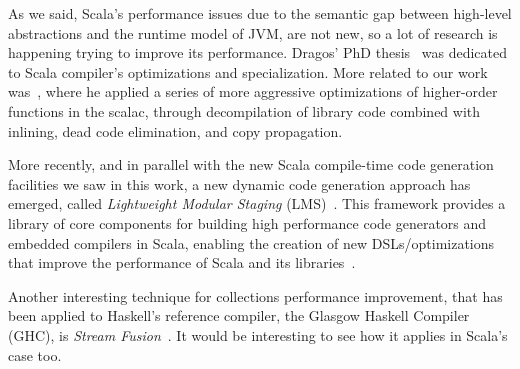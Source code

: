\label{related}
As we said, Scala's performance issues due to the semantic gap between high-level abstractions and the runtime model of JVM, are not new, so a lot of research is happening trying to improve its performance. Dragos' PhD thesis~\cite{dragos2010compiling} was dedicated to Scala compiler's optimizations and specialization. More related to our work was~\cite{dragos2008optimizing}, where he applied a series of more aggressive optimizations of higher-order functions in the scalac, through decompilation of library code combined with inlining, dead code elimination, and copy propagation.

More recently, and in parallel with the new Scala compile-time code generation facilities we saw in this work, a new dynamic code generation approach has emerged, called \emph{Lightweight Modular Staging} (LMS)~\cite{rompf2010lightweight,rompf2011building}. This framework provides a library of core components for building high performance code generators and embedded compilers in Scala, enabling the creation of new DSLs/optimizations that improve the performance of Scala and its libraries~\cite{moors2012scala,brown2011heterogeneous,ureche2012stagedsac,rompf2013optimizing}.

Another interesting technique for collections performance improvement, that has been applied to Haskell's reference compiler, the Glasgow Haskell Compiler (GHC), is \emph{Stream Fusion}~\cite{coutts2007stream,mainlandhaskell}. It would be interesting to see how it applies in Scala's case too.
